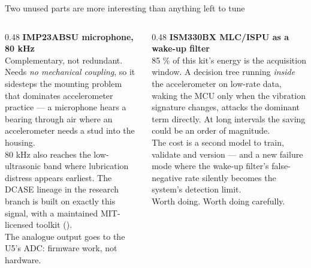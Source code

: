 \documentclass[aspectratio=169,10pt]{beamer}
\begin{document}
\begin{frame}{Two unused parts are more interesting than anything left to tune}
  \begin{columns}[T]
    \begin{column}{0.48\textwidth}
      \small\textbf{IMP23ABSU microphone, 80 kHz}
      \\[1.5mm]
      \scriptsize
      Complementary, not redundant. Needs \emph{no mechanical coupling}, so it
      sidesteps the mounting problem that dominates accelerometer practice --- a
      microphone hears a bearing through air where an accelerometer needs a stud
      into the housing.
      \\[1mm]
      80 kHz also reaches the low-ultrasonic band where lubrication distress
      appears earliest. The DCASE lineage in the research branch is built on
      exactly this signal, with a maintained MIT-licensed toolkit
      ().
      \\[1mm]
      The analogue output goes to the U5's ADC: firmware work, not hardware.
    \end{column}
    \begin{column}{0.48\textwidth}
      \small\textbf{ISM330BX MLC/ISPU as a wake-up filter}
      \\[1.5mm]
      \scriptsize
      85 \% of this kit's energy is the acquisition window. A decision tree
      running \emph{inside} the accelerometer on low-rate data, waking the MCU
      only when the vibration signature changes, attacks the dominant term
      directly. At long intervals the saving could be an order of magnitude.
      \\[1mm]
      The cost is a second model to train, validate and version --- and a new
      failure mode where the wake-up filter's false-negative rate silently
      becomes the system's detection limit.
      \\[1mm]
      Worth doing. Worth doing carefully.
    \end{column}
  \end{columns}
\end{frame}
\end{document}
